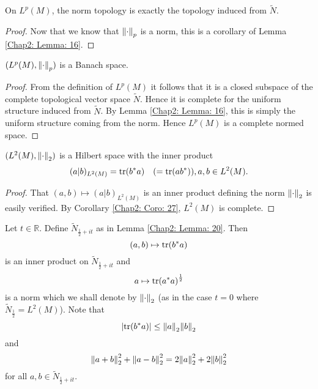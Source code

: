 \begin{proposition}
    On $L^p(M)$, the norm topology is exactly the topology induced from $\tilde{N}$.
\end{proposition}
\begin{proof}
    Now that we know that $\norm{\cdot}_p$ is a norm, this is a corollary of Lemma \ref{Chap2: Lemma: 16}.
\end{proof}
\begin{corollary}\label{Chap2: Coro: 27}
    $(L^p(M),\norm{\cdot}_p)$ is a Banach space.
\end{corollary}
\begin{proof}
    From the definition of $L^p(M)$ it follows that it is a closed subspace of the complete topological vector space $\tilde{N}$. Hence it is complete for the uniform structure induced from $\tilde{N}$. By Lemma \ref{Chap2: Lemma: 16}, this is simply the uniform structure coming from the norm. Hence $L^p(M)$ is a complete normed space.
\end{proof}
\begin{corollary}
    $(L^2(M),\norm{\cdot}_2)$ is a Hilbert space with the inner product
    \[
        (a|b)_{L^2(M)}=\tr(b^*a)\quad (=\tr(ab^*)),a,b\in L^2(M).
    \]
\end{corollary}
\begin{proof}
    That $(a,b)\mapsto (a|b)_{L^2(M)}$ is an inner product defining the norm $\norm{\cdot}_2$ is easily verified. By Corollary \ref{Chap2: Coro: 27}, $L^2(M)$ is complete.
\end{proof}
\begin{remark}
    Let $t\in \mathbb{R}$. Define $\tilde{N}_{\frac{1}{2}+it}$ as in Lemma \ref{Chap2: Lemma: 20}. Then
    \[
        (a,b)\mapsto \tr(b^*a)
    \]
    is an inner product on $\tilde{N}_{\frac{1}{2}+it}$ and
    \[
        a\mapsto \tr(a^*a)^\frac{1}{2}
    \]
    is a norm which we shall denote by $\norm{\cdot}_2$ (as in the case $t=0$ where $\tilde{N}_{\frac{1}{2}}=L^2(M)$). Note that
    \[
        \abs{\tr(b^*a)}\leq \norm{a}_2\norm{b}_2
    \]
    and
    \[
        \norm{a+b}_2^2+\norm{a-b}_2^2=2\norm{a}_2^2+2\norm{b}_2^2
    \]
    for all $a,b\in \tilde{N}_{\frac{1}{2}+it}$.
\end{remark}
% 